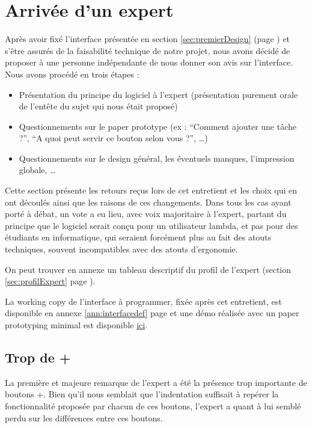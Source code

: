 \documentclass[11pt]{article}
\begin{document}
\section{Arrivée d'un expert}

Après avoir fixé l'interface présentée en section
\ref{sec:premierDesign} (page \pageref{sec:premierDesign}) et s'être
assurés de la faisabilité technique de notre projet, nous avons décidé
de proposer à une personne indépendante de nous donner son avis sur
l'interface. Nous avons procédé en trois étapes :

\begin{itemize}
\item Présentation du principe du logiciel à l'expert (présentation
  purement orale de l'entête du sujet qui nous était proposé)
\item Questionnements sur le paper prototype (ex : ``Comment ajouter
  une tâche ?'', ``A quoi peut servir ce bouton selon vous ?'', \dots)
\item Questionnements sur le design général, les éventuels manques,
  l'impression globale, \dots
\end{itemize}

Cette section présente les retours reçus lors de cet entretient et les
choix qui en ont découlés ainsi que les raisons de ces changements.
Dans tous les cas ayant porté à débat, un vote a eu lieu, avec voix
majoritaire à l'expert, partant du principe que le logiciel serait
conçu pour un utilisateur lambda, et pas pour des étudiants en
informatique, qui seraient forcément plus au fait des atouts
techniques, souvent incompatibles avec des atouts d'ergonomie.

On peut trouver en annexe un tableau descriptif du profil de l'expert
(section \ref{sec:profilExpert} page \pageref{sec:profilExpert}).

La working copy de l'interface à programmer, fixée après cet
entretient, est disponible en annexe \ref{ann:interfacedef} page
\pageref{fig:interfacedefdessin} et une démo réalisée avec un paper
prototyping minimal est disponible
\href{http://daimrod.sbrk.org/demo-taser.MOV}{ici}.

\subsection{Trop de +}

La première et majeure remarque de l'expert a été la présence trop
importante de boutons +. Bien qu'il nous semblait que l'indentation
suffisait à repérer la fonctionnalité proposée par chacun de ces
boutons, l'expert a quant à lui semblé perdu sur les différences entre
ces boutons.
\end{document}
